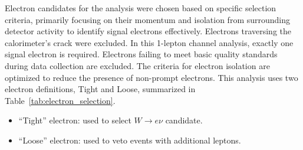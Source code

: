 \label{subsec:electron_selection}
Electron candidates for the analysis were chosen based on specific selection criteria, primarily focusing on their momentum and isolation from surrounding detector activity to identify signal electrons effectively. Electrons traversing the calorimeter's crack were excluded. 
In this 1-lepton channel analysis, exactly one signal electron is required. Electrons failing to meet basic quality standards during data collection are excluded.
The criteria for electron isolation are optimized to reduce the presence of non-prompt electrons.
This analysis uses two electron definitions, Tight and Loose, summarized in Table~\ref{tab:electron_selection}.
\begin{itemize}
\item ``Tight'' electron: used to select $W\to e \nu$ candidate.
\item ``Loose'' electron: used to veto events with additional leptons.
\end{itemize}


